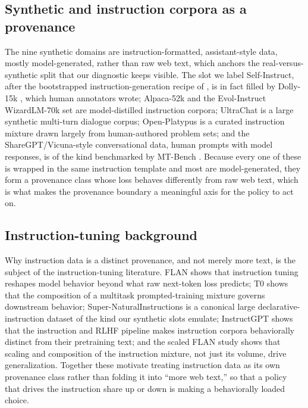 \documentclass{article}
\begin{document}
\subsection{Synthetic and instruction corpora as a provenance}

The nine synthetic domains are instruction-formatted, assistant-style data, mostly model-generated, rather than raw web text, which anchors the real-versus-synthetic split that our diagnostic keeps visible. The slot we label Self-Instruct, after the bootstrapped instruction-generation recipe of \citet{selfinstruct2023}, is in fact filled by Dolly-15k \citep{dolly2023}, which human annotators wrote; Alpaca-52k \citep{alpaca2023} and the Evol-Instruct WizardLM-70k set \citep{wizardlm2024} are model-distilled instruction corpora; UltraChat \citep{ultrachat2023} is a large synthetic multi-turn dialogue corpus; Open-Platypus \citep{platypus2023} is a curated instruction mixture drawn largely from human-authored problem sets; and the ShareGPT/Vicuna-style conversational data, human prompts with model responses, is of the kind benchmarked by MT-Bench \citep{mtbench2023}. Because every one of these is wrapped in the same instruction template and most are model-generated, they form a provenance class whose loss behaves differently from raw web text, which is what makes the provenance boundary a meaningful axis for the policy to act on.

\subsection{Instruction-tuning background}

Why instruction data is a distinct provenance, and not merely more text, is the subject of the instruction-tuning literature. FLAN \citep{wei2022flan} shows that instruction tuning reshapes model behavior beyond what raw next-token loss predicts; T0 \citep{sanh2022t0} shows that the composition of a multitask prompted-training mixture governs downstream behavior; Super-NaturalInstructions \citep{wang2022supernaturalinstructions} is a canonical large declarative-instruction dataset of the kind our synthetic slots emulate; InstructGPT \citep{ouyang2022instructgpt} shows that the instruction and RLHF pipeline makes instruction corpora behaviorally distinct from their pretraining text; and the scaled FLAN study \citep{chung2024scalingflan} shows that scaling and composition of the instruction mixture, not just its volume, drive generalization. Together these motivate treating instruction data as its own provenance class rather than folding it into ``more web text,'' so that a policy that drives the instruction share up or down is making a behaviorally loaded choice.
\end{document}
